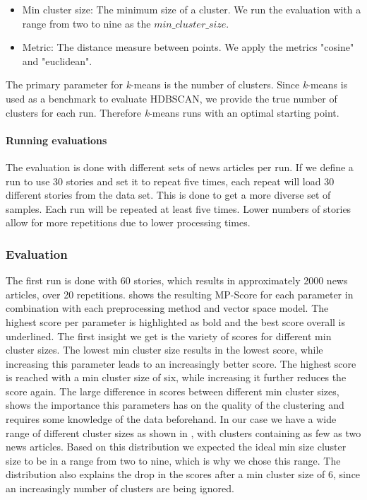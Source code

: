 \begin{itemize}
    \item Min cluster size: The minimum size of a cluster. We run the evaluation with a range from two to nine as the $min\_cluster\_size$. 
    \item Metric: The distance measure between points. We apply the metrics "cosine" and "euclidean". 
\end{itemize}

The primary parameter for \textit{k}-means is the number of clusters.
Since \textit{k}-means is used as a benchmark to evaluate HDBSCAN, we provide the true number of clusters for each run.
Therefore \textit{k}-means runs with an optimal starting point.

\paragraph{Running evaluations}
The evaluation is done with different sets of news articles per run.
If we define a run to use 30 stories and set it to repeat five times,
each repeat will load 30 different stories from the data set.
This is done to get a more diverse set of samples.
Each run will be repeated at least five times.
Lower numbers of stories allow for more repetitions due to lower processing times.

\subsubsection{Evaluation}
\label{subsubsec:5a_evaluation}

The first run is done with 60 stories, which results in approximately 2000 news articles, over 20 repetitions.
 shows the resulting MP-Score for each parameter in combination with each preprocessing method and vector space model.
The highest score per parameter is highlighted as bold and the best score overall is underlined.
The first insight we get is the variety of scores for different min cluster sizes.
The lowest min cluster size results in the lowest score,
while increasing this parameter leads to an increasingly better score.
The highest score is reached with a min cluster size of six, while increasing it further reduces the score again.
The large difference in scores between different min cluster sizes,
shows the importance this parameters has on the quality of the clustering and requires some knowledge of the data beforehand.
In our case we have a wide range of different cluster sizes as shown in ,
with clusters containing as few as two news articles.
Based on this distribution we expected the ideal min size cluster size to be in a range from two to nine, which is why we chose this range.
The distribution also explains the drop in the scores after a min cluster size of 6, since an increasingly number of clusters are being ignored.

